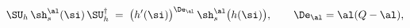\begin{equation}\label{gvir}
\SU_h\,\sh^{\al}_s(\si)\,\SU^{\dagger}_h\;=\;\bigl(
h'(\si) %
\bigr)^{\De_{\al}}\,\sh^{\al}_s\big(h(\si)\big),\qquad
\De_{\al}=\al(Q-\al),
\end{equation}


